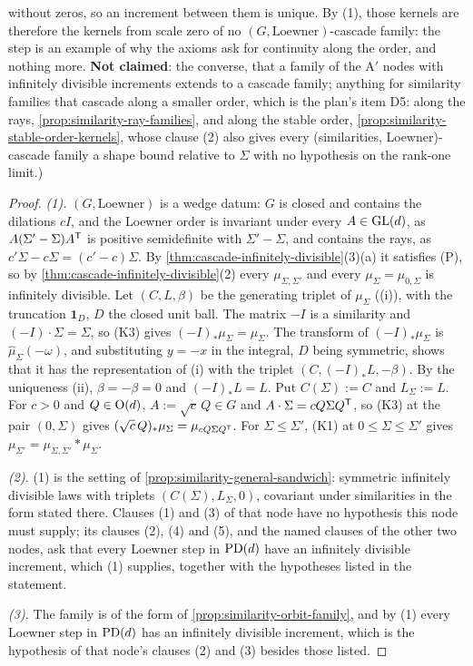 \begin{proposition}
{without zeros, so an increment between them is unique. By (1), those kernels are therefore the kernels
from scale zero of no $(G, \text{Loewner})$-cascade family: the step is an example of why the axioms ask
for continuity along the order, and nothing more. \textbf{Not claimed}: the converse, that a family of
the A$'$ nodes with infinitely divisible increments extends to a cascade family; anything for
similarity families that cascade along a smaller order, which is the plan's item D5: along the rays,
\ref{prop:similarity-ray-families}, and along the stable order, \ref{prop:similarity-stable-order-kernels},
whose clause (2) also gives every (similarities, Loewner)-cascade family a shape bound relative to
$\Sigma$ with no hypothesis on the rank-one limit.)}
\end{proposition}

\begin{proof}
\leanok
\emph{(1).} $(G, \text{Loewner})$ is a wedge datum: $G$ is closed and contains the dilations $cI$, and
the Loewner order is invariant under every $A \in \mathrm{GL}(d)$, as $A(\Sigma' - \Sigma)A^{\mathsf{T}}$ is positive
semidefinite with $\Sigma' - \Sigma$, and contains the rays, as $c'\Sigma - c\Sigma = (c' - c)\Sigma$.
By \ref{thm:cascade-infinitely-divisible}(3)(a) it satisfies (P), so by
\ref{thm:cascade-infinitely-divisible}(2) every $\mu_{\Sigma,\Sigma'}$ and every
$\mu_\Sigma = \mu_{0,\Sigma}$ is infinitely divisible. Let $(C, L, \beta)$ be the generating triplet of
$\mu_\Sigma$ ((i)), with the truncation $\mathbf 1_D$, $D$ the closed unit ball. The matrix
$-I$ is a similarity and $(-I)\cdot\Sigma = \Sigma$, so (K3) gives $(-I)_*\mu_\Sigma = \mu_\Sigma$. The
transform of $(-I)_*\mu_\Sigma$ is $\widehat\mu_\Sigma(-\omega)$, and substituting $y = -x$ in the
\Levy{} integral, $D$ being symmetric, shows that it has the representation of (i) with the
triplet $(C, (-I)_*L, -\beta)$. By the uniqueness (ii), $\beta = -\beta = 0$ and
$(-I)_*L = L$. Put $C(\Sigma) := C$ and $L_\Sigma := L$. For $c > 0$ and $Q \in \mathrm{O}(d)$,
$A := \sqrt c\,Q \in G$ and $A \cdot \Sigma = cQ\Sigma Q^{\mathsf{T}}$, so (K3) at the pair $(0, \Sigma)$ gives
$(\sqrt c\,Q)_*\mu_\Sigma = \mu_{cQ\Sigma Q^{\mathsf{T}}}$. For $\Sigma \le \Sigma'$, (K1) at
$0 \le \Sigma \le \Sigma'$ gives $\mu_{\Sigma'} = \mu_{\Sigma,\Sigma'} * \mu_\Sigma$.

\emph{(2).} (1) is the setting of \ref{prop:similarity-general-sandwich}: symmetric infinitely divisible
laws with triplets $(C(\Sigma), L_\Sigma, 0)$, covariant under similarities in the form stated there.
Clauses (1) and (3) of that node have no hypothesis this node must supply; its clauses (2), (4) and (5), and the
named clauses of the other two nodes, ask that every Loewner step in $\mathrm{PD}(d)$ have an infinitely divisible
increment, which (1) supplies, together with the hypotheses listed in the statement.

\emph{(3).} The family is of the form of \ref{prop:similarity-orbit-family}, and by (1) every Loewner
step in $\mathrm{PD}(d)$ has an infinitely divisible increment, which is the hypothesis of that node's clauses
(2) and (3) besides those listed.
\end{proof}

